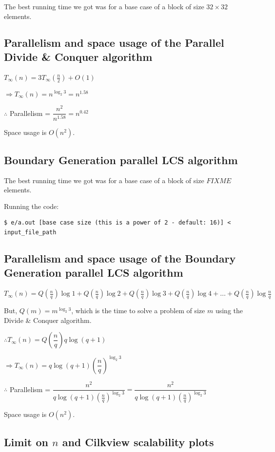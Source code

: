 \documentclass{article}
\begin{document}
The best running time we got was for a base case of a block of size $32 \times 32$ elements.

\subsection{Parallelism and space usage of the Parallel Divide \& Conquer algorithm}

$T_{\infty}(n) = 3T_{\infty}(\frac{n}{2}) + O(1)$

$\Rightarrow T_{\infty}(n) = n^{\log_2{3}} = n^{1.58}$

$\therefore$ Parallelism = $\dfrac{n^2}{n^{1.58}} = n^{0.42}$

Space usage is $O(n^2)$.

\subsection{Boundary Generation parallel LCS algorithm}

The best running time we got was for a base case of a block of size $FIXME$ elements.

Running the code:
\begin{verbatim}
$ e/a.out [base case size (this is a power of 2 - default: 16)] < input_file_path
\end{verbatim}

\subsection{Parallelism and space usage of the Boundary Generation parallel LCS algorithm}

$T_{\infty}(n) = Q(\frac{n}{q})\log{1} + Q(\frac{n}{q})\log{2} + Q(\frac{n}{q})\log{3} + Q(\frac{n}{q})\log{4} + \ldots{} + Q(\frac{n}{q})\log{\frac{n}{q}}$

But, $Q(m) = m^{\log_2{3}}$, which is the time to solve a problem of size $m$ using the Divide \& Conquer algorithm.

$\therefore T_{\infty}(n) = Q(\dfrac{n}{q})q\log{(q+1)}$

$\Rightarrow T_{\infty}(n) = q\log{(q+1)}\left(\dfrac{n}{q}\right)^{\log_2{3}}$

$\therefore$ Parallelism = $\dfrac{n^2}{q\log{(q+1)}(\frac{n}{q})^{\log_2{3}}} = \dfrac{n^2}{q\log{(q+1)}(\frac{n}{q})^{\log_2{3}}}$

Space usage is $O(n^2)$.

\subsection{Limit on $n$ and Cilkview scalability plots}
\end{document}
